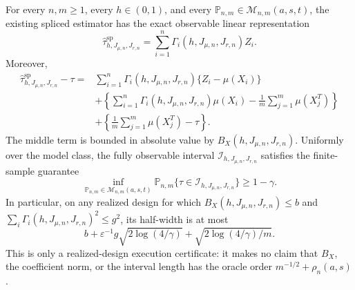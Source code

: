 For every \(n,m\ge1\), every \(h\in(0,1)\), and every \(\mathbb P_{n,m}\in\mathcal M_{n,m}(a,s,t)\), the existing spliced estimator has the exact observable linear representation
\[
\widehat\tau^{\mathrm{sp}}_{h,J_{\mu,n},J_{r,n}}
=\sum_{i=1}^n\Gamma_i(h,J_{\mu,n},J_{r,n})Z_i.
\]
Moreover,
\[
\begin{aligned}
\widehat\tau^{\mathrm{sp}}_{h,J_{\mu,n},J_{r,n}}-\tau
={}&\sum_{i=1}^n\Gamma_i(h,J_{\mu,n},J_{r,n})\{Z_i-\mu(X_i)\}\\
&+\left\{\sum_{i=1}^n\Gamma_i(h,J_{\mu,n},J_{r,n})\mu(X_i)-\frac1m\sum_{j=1}^m\mu(X_j^T)\right\}\\
&+\left\{\frac1m\sum_{j=1}^m\mu(X_j^T)-\tau\right\}.
\end{aligned}
\]
The middle term is bounded in absolute value by \(B_X(h,J_{\mu,n},J_{r,n})\). Uniformly over the model class, the fully observable interval \(\mathcal I_{h,J_{\mu,n},J_{r,n}}\) satisfies the finite-sample guarantee
\[
\inf_{\mathbb P_{n,m}\in\mathcal M_{n,m}(a,s,t)}
\mathbb P_{n,m}\{\tau\in\mathcal I_{h,J_{\mu,n},J_{r,n}}\}\ge1-\gamma.
\]
In particular, on any realized design for which \(B_X(h,J_{\mu,n},J_{r,n})\le b\) and \(\sum_i\Gamma_i(h,J_{\mu,n},J_{r,n})^2\le g^2\), its half-width is at most
\[
b+\varepsilon^{-1}g\sqrt{2\log(4/\gamma)}+\sqrt{2\log(4/\gamma)/m}.
\]
This is only a realized-design execution certificate: it makes no claim that \(B_X\), the coefficient norm, or the interval length has the oracle order \(m^{-1/2}+\rho_n(a,s)\).